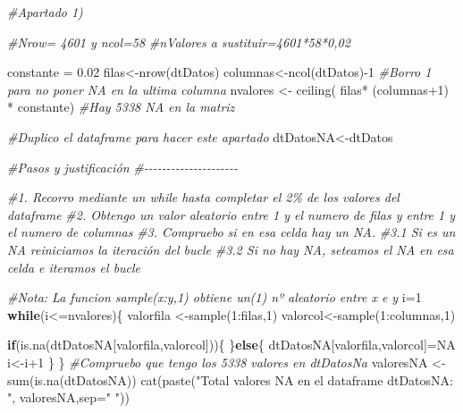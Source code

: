 \documentclass[
]{article}
\newenvironment{Shaded}{\begin{snugshade}}{\end{snugshade}}
\newcommand{\AttributeTok}[1]{\textcolor[rgb]{0.77,0.63,0.00}{#1}}
\newcommand{\CommentTok}[1]{\textcolor[rgb]{0.56,0.35,0.01}{\textit{#1}}}
\newcommand{\ConstantTok}[1]{\textcolor[rgb]{0.00,0.00,0.00}{#1}}
\newcommand{\ControlFlowTok}[1]{\textcolor[rgb]{0.13,0.29,0.53}{\textbf{#1}}}
\newcommand{\DecValTok}[1]{\textcolor[rgb]{0.00,0.00,0.81}{#1}}
\newcommand{\FloatTok}[1]{\textcolor[rgb]{0.00,0.00,0.81}{#1}}
\newcommand{\FunctionTok}[1]{\textcolor[rgb]{0.00,0.00,0.00}{#1}}
\newcommand{\NormalTok}[1]{#1}
\newcommand{\OtherTok}[1]{\textcolor[rgb]{0.56,0.35,0.01}{#1}}
\newcommand{\SpecialCharTok}[1]{\textcolor[rgb]{0.00,0.00,0.00}{#1}}
\newcommand{\StringTok}[1]{\textcolor[rgb]{0.31,0.60,0.02}{#1}}
\begin{document}
\begin{Shaded}
\begin{Highlighting}[]
  \CommentTok{\#Apartado 1)}

  \CommentTok{\#Nrow= 4601 y ncol=58}
  \CommentTok{\#nValores a sustituir=4601*58*0,02}

\NormalTok{  constante }\OtherTok{=} \FloatTok{0.02}
\NormalTok{  filas}\OtherTok{\textless{}{-}}\FunctionTok{nrow}\NormalTok{(dtDatos)}
\NormalTok{  columnas}\OtherTok{\textless{}{-}}\FunctionTok{ncol}\NormalTok{(dtDatos)}\SpecialCharTok{{-}}\DecValTok{1} \CommentTok{\#Borro 1 para no poner NA en la ultima columna}
\NormalTok{  nvalores }\OtherTok{\textless{}{-}} \FunctionTok{ceiling}\NormalTok{( filas}\SpecialCharTok{*}\NormalTok{ (columnas}\SpecialCharTok{+}\DecValTok{1}\NormalTok{)  }\SpecialCharTok{*}\NormalTok{ constante)}
  \CommentTok{\#Hay 5338 NA en la matriz}
  
  \CommentTok{\#Duplico el dataframe para hacer este apartado}
\NormalTok{  dtDatosNA}\OtherTok{\textless{}{-}}\NormalTok{dtDatos}

  \CommentTok{\#Pasos y justificación}
  \CommentTok{\#{-}{-}{-}{-}{-}{-}{-}{-}{-}{-}{-}{-}{-}{-}{-}{-}{-}{-}{-}{-}{-}}
  
  \CommentTok{\#1. Recorro mediante un while hasta completar el 2\% de los valores del dataframe}
  \CommentTok{\#2. Obtengo un valor aleatorio entre 1 y el numero de filas y entre 1 y el numero de columnas}
  \CommentTok{\#3. Compruebo si en esa celda hay un NA.}
  \CommentTok{\#3.1 Si es un NA reiniciamos la iteración del bucle}
  \CommentTok{\#3.2 Si no hay NA, seteamos el NA en esa celda e iteramos el bucle}
  
  \CommentTok{\#Nota: La funcion sample(x:y,1) obtiene un(1) nº aleatorio entre \textquotesingle{}x\textquotesingle{} e \textquotesingle{}y\textquotesingle{}}
\NormalTok{  i}\OtherTok{=}\DecValTok{1}
  \ControlFlowTok{while}\NormalTok{(i}\SpecialCharTok{\textless{}=}\NormalTok{nvalores)\{}
\NormalTok{    valorfila }\OtherTok{\textless{}{-}}\FunctionTok{sample}\NormalTok{(}\DecValTok{1}\SpecialCharTok{:}\NormalTok{filas,}\DecValTok{1}\NormalTok{)}
\NormalTok{    valorcol}\OtherTok{\textless{}{-}}\FunctionTok{sample}\NormalTok{(}\DecValTok{1}\SpecialCharTok{:}\NormalTok{columnas,}\DecValTok{1}\NormalTok{)}
    
    \ControlFlowTok{if}\NormalTok{(}\FunctionTok{is.na}\NormalTok{(dtDatosNA[valorfila,valorcol]))\{}
\NormalTok{    \}}\ControlFlowTok{else}\NormalTok{\{}
\NormalTok{      dtDatosNA[valorfila,valorcol]}\OtherTok{=}\ConstantTok{NA}
\NormalTok{      i}\OtherTok{\textless{}{-}}\NormalTok{i}\SpecialCharTok{+}\DecValTok{1}
\NormalTok{    \}}
\NormalTok{  \}}
  \CommentTok{\#Compruebo que tengo los 5338 valores en dtDatosNa}
\NormalTok{  valoresNA }\OtherTok{\textless{}{-}}\FunctionTok{sum}\NormalTok{(}\FunctionTok{is.na}\NormalTok{(dtDatosNA))}
  \FunctionTok{cat}\NormalTok{(}\FunctionTok{paste}\NormalTok{(}\StringTok{"Total valores NA en el dataframe dtDatosNA: "}\NormalTok{, valoresNA,}\AttributeTok{sep=}\StringTok{" "}\NormalTok{))}
\end{Highlighting}
\end{Shaded}
\end{document}
